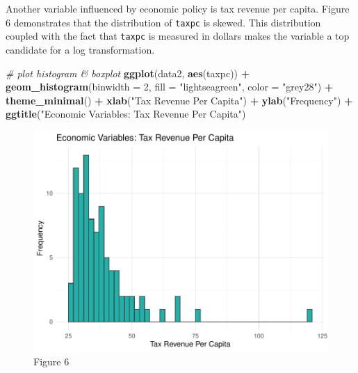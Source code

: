\documentclass[]{article}
\newenvironment{Shaded}{\begin{snugshade}}{\end{snugshade}}
\newcommand{\CommentTok}[1]{\textcolor[rgb]{0.56,0.35,0.01}{\textit{#1}}}
\newcommand{\DataTypeTok}[1]{\textcolor[rgb]{0.13,0.29,0.53}{#1}}
\newcommand{\DecValTok}[1]{\textcolor[rgb]{0.00,0.00,0.81}{#1}}
\newcommand{\KeywordTok}[1]{\textcolor[rgb]{0.13,0.29,0.53}{\textbf{#1}}}
\newcommand{\NormalTok}[1]{#1}
\newcommand{\OperatorTok}[1]{\textcolor[rgb]{0.81,0.36,0.00}{\textbf{#1}}}
\newcommand{\StringTok}[1]{\textcolor[rgb]{0.31,0.60,0.02}{#1}}
\begin{document}
Another variable influenced by economic policy is tax revenue per
capita. Figure 6 demonstrates that the distribution of \texttt{taxpc} is
skewed. This distribution coupled with the fact that \texttt{taxpc} is
measured in dollars makes the variable a top candidate for a log
transformation.

\begin{Shaded}
\begin{Highlighting}[]
\CommentTok{# plot histogram & boxplot}
\KeywordTok{ggplot}\NormalTok{(data2, }\KeywordTok{aes}\NormalTok{(taxpc)) }\OperatorTok{+}
\StringTok{  }\KeywordTok{geom_histogram}\NormalTok{(}\DataTypeTok{binwidth =} \DecValTok{2}\NormalTok{, }\DataTypeTok{fill =} \StringTok{"lightseagreen"}\NormalTok{, }\DataTypeTok{color =} \StringTok{"grey28"}\NormalTok{) }\OperatorTok{+}
\StringTok{  }\KeywordTok{theme_minimal}\NormalTok{() }\OperatorTok{+}
\StringTok{  }\KeywordTok{xlab}\NormalTok{(}\StringTok{"Tax Revenue Per Capita"}\NormalTok{) }\OperatorTok{+}
\StringTok{  }\KeywordTok{ylab}\NormalTok{(}\StringTok{"Frequency"}\NormalTok{) }\OperatorTok{+}
\StringTok{  }\KeywordTok{ggtitle}\NormalTok{(}\StringTok{"Economic Variables: Tax Revenue Per Capita"}\NormalTok{)}
\end{Highlighting}
\end{Shaded}

\begin{figure}

{\centering \includegraphics{lab_3_v7_files/figure-latex/unnamed-chunk-20-1} 

}

\caption{Figure 6}\label{fig:unnamed-chunk-20}
\end{figure}
\end{document}
